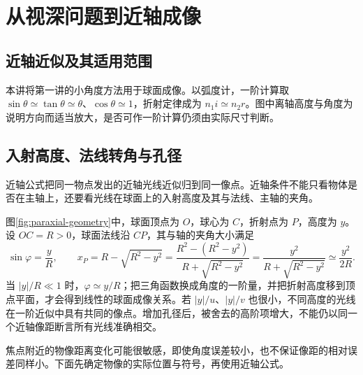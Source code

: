 \section{从视深问题到近轴成像}

\subsection{近轴近似及其适用范围}

本讲将第一讲的小角度方法用于球面成像。以弧度计，一阶计算取 $\sin\theta\simeq\tan\theta\simeq\theta$、$\cos\theta\simeq1$，折射定律成为 $n_1i\simeq n_2r$。图中离轴高度与角度为说明方向而适当放大，是否可作一阶计算仍须由实际尺寸判断。

\subsection{入射高度、法线转角与孔径}

近轴公式把同一物点发出的近轴光线近似归到同一像点。近轴条件不能只看物体是否在主轴上，还要看光线在球面上的入射高度及其与法线、主轴的夹角。

图\ref{fig:paraxial-geometry}中，球面顶点为 $O$，球心为 $C$，折射点为 $P$，高度为 $y$。设 $OC=R>0$，球面法线沿 $CP$，其与轴的夹角大小满足
\[
 \sin\varphi=\frac yR,\qquad
 x_P=R-\sqrt{R^2-y^2}
=\frac{R^2-(R^2-y^2)}{R+\sqrt{R^2-y^2}}
=\frac{y^2}{R+\sqrt{R^2-y^2}}
\simeq\frac{y^2}{2R}.
\]
当 $|y|/R\ll1$ 时，$\varphi\simeq y/R$；把三角函数换成角度的一阶量，并把折射高度移到顶点平面，才会得到线性的球面成像关系。若 $|y|/u$、$|y|/v$ 也很小，不同高度的光线在一阶近似中具有共同的像点。增加孔径后，被舍去的高阶项增大，不能仍以同一个近轴像距断言所有光线准确相交。

焦点附近的物像距离变化可能很敏感，即使角度误差较小，也不保证像距的相对误差同样小。下面先确定物像的实际位置与符号，再使用近轴公式。

